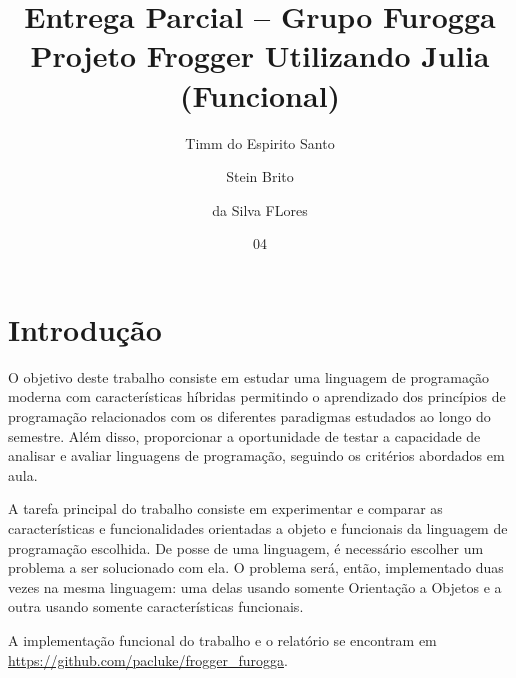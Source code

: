 \documentclass[rel_mlp]{iiufrgs}
\title{Entrega Parcial -- Grupo Furogga \\ Projeto Frogger Utilizando Julia (Funcional)}
\author{Timm do Espirito Santo}{Augusto} %
\author{Stein Brito}{Eduardo} %
\author{da Silva FLores}{Lucas} %
\date{04}{2018}
\begin{document}
\maketitle      


\tableofcontents








%
\chapter{Introdução} \label{intro}



O objetivo deste trabalho consiste em estudar uma linguagem de programação moderna com características híbridas permitindo o aprendizado dos princípios de programação relacionados com os diferentes paradigmas estudados ao longo do semestre. Além disso, proporcionar a oportunidade de testar a capacidade de analisar e avaliar linguagens de programação, seguindo os critérios abordados em aula.

A tarefa principal do trabalho consiste em experimentar e comparar as características e funcionalidades orientadas a objeto e funcionais da linguagem de programação escolhida. De posse de uma linguagem, é necessário escolher um problema a ser solucionado com ela. O problema será, então, implementado duas vezes na mesma linguagem: uma delas usando somente Orientação a Objetos e a outra usando somente características funcionais.

A implementação funcional do trabalho e o relatório se encontram em \url{https://github.com/pacluke/frogger_furogga}.



\end{document}
